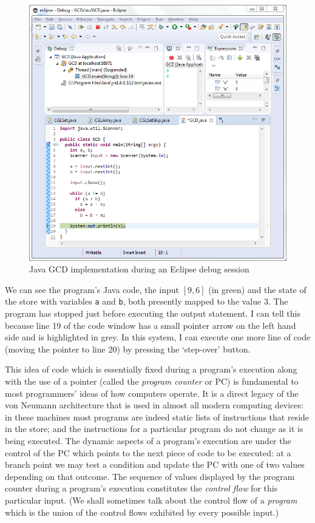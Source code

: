 \documentclass[11pt]{book}
\begin{document}
\begin{figure}
\hspace*{-2.5cm}\includegraphics{png/GCDEclipse.png}
\vspace*{1cm}
\caption{Java GCD implementation during an Eclipse debug session}
\label{eclipse:gcd}
\end{figure}

We can see the program's Java code, the input $[ 9, 6 ]$ (in green) and the state of the store with variables {\tt a} and {\tt b}, both presently mapped to the value 3. The program has stopped just before executing the output statement. I can tell this because line 19 of the code window has a small pointer arrow on the left hand side and is highlighted in grey. In this system, I can execute one more line of code (moving the pointer to line 20) by pressing the `step-over' button.

This idea of code which is essentially fixed during a program's execution along with the use of a pointer (called the {\em program counter} or PC) is fundamental to most programmers' ideas of how computers operate. It is a direct legacy of the von Neumann architecture that is used in almost all modern computing devices: in these machines most programs are indeed static lists of instructions that reside in the store; and the instructions for a particular program do not change as it is being executed. The dynamic aspects of a program's execution are under the control of the PC which points to the next piece of code to be executed: at a branch point we may test a condition and update the PC with one of two values depending on that outcome. The sequence of values displayed by the program counter during a program's execution constitutes the {\em control flow} for this particular input. (We shall sometimes talk about the control flow of a {\em program} which is the union of the control flows exhibited by every possible input.)
\end{document}
